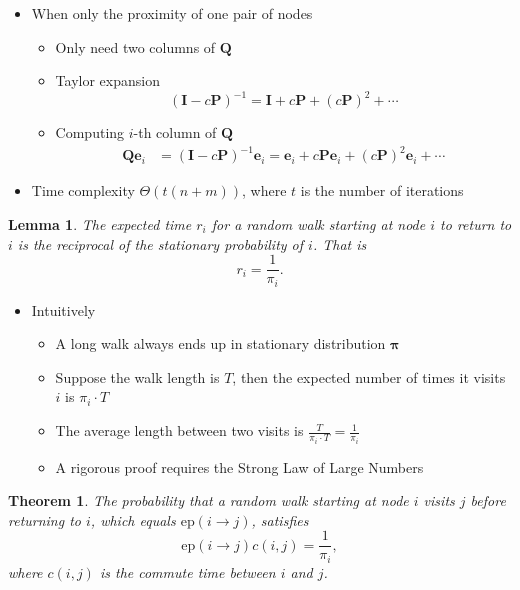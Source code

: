 \documentclass{article}
\newtheorem*{mythm*}{Theorem}
\newtheorem*{mylem*}{Lemma}
\begin{document}
\begin{itemize}
\item When only the proximity of one pair of nodes
\begin{itemize}
\item Only need two columns of $\bm{Q}$
\item Taylor expansion
\[(\bm{I} - c\bm{P})^{-1} = \bm{I} + c\bm{P} + (c\bm{P})^2 + \cdots\]
\item Computing $i$-th column of $\bm{Q}$
\begin{align*}
\bm{Q}\bm{e}_i &= (\bm{I} - c\bm{P})^{-1} \bm{e}_i = \bm{e}_i + c\bm{P} \bm{e}_i + (c\bm{P})^2 \bm{e}_i + \cdots
\end{align*}
\end{itemize}
\item Time complexity $\Theta\left(t(n + m)\right)$, where $t$ is the number of iterations
\end{itemize}

\begin{mylem*}
The expected time $r_i$ for a random walk starting at node $i$ to return to $i$ is the reciprocal of the stationary probability of $i$.
That is
\[
r_i = \frac{1}{\pi_i}.
\]
\end{mylem*}

\begin{itemize}
\item Intuitively
\begin{itemize}
\item A long walk always ends up in stationary distribution $\bm{\pi}$
\item Suppose the walk length is $T$, then the expected number of times it visits $i$ is $\pi_i \cdot T$
\item The average length between two visits is $\frac{T}{\pi_i \cdot T} = \frac{1}{\pi_i}$
\item A rigorous proof requires the Strong Law of Large Numbers
\end{itemize}
\end{itemize}

\begin{mythm*}
The probability that a random walk starting at node $i$ visits $j$ before returning to $i$, which equals $\mathrm{ep}(i\rightarrow j)$, satisfies
\[
\mathrm{ep}(i\rightarrow j)c(i,j) = \frac{1}{\pi_i},
\]
where $c(i,j)$ is the commute time between $i$ and $j$.
\end{mythm*}
\end{document}
